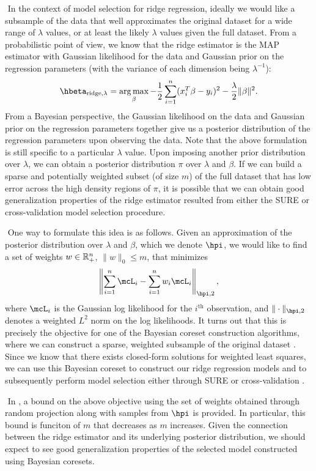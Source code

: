 $ $\newline
In the context of model selection for ridge regression, ideally we would like a subsample of the data that well approximates the original dataset for a wide range of $\lambda$ values, or at least the likely $\lambda$ values given the full dataset. From a probabilistic point of view, we know that the ridge estimator is the MAP estimator with Gaussian likelihood for the data and Gaussian prior on the regression parameters (with the variance of each dimension being $\lambda^{-1}$):
\[
\hbeta_{\text{ridge},\lambda} = \argmax_{\beta} -\frac{1}{2}\sum_{i=1}^n (x_i^T\beta - y_i)^2 - \frac{\lambda}{2}\|\beta\|^2.
\]
From a Bayesian perspective, the Gaussian likelihood on the data and Gaussian prior on the regression parameters together give us a posterior distribution of the regression parameters upon observing the data. Note that the above formulation is still specific to a particular $\lambda$ value. Upon imposing another prior distribution over $\lambda$, we can obtain a posterior distribution $\pi$ over $\lambda$ and $\beta$. If we can build a sparse and potentially weighted subset (of size $m$) of the full dataset that has low error across the high density regions of $\pi$, it is possible that we can obtain good generalization properties of the ridge estimator resulted from either the SURE or cross-validation model selection procedure.

$ $\newline
One way to formulate this idea is as follows. Given an approximation of the posterior distribution over $\lambda$ and $\beta$, which we denote $\hpi$, we would like to find a set of weights $w \in\mathbb{R}_+^n$, $\|w\|_0 \leq m$, that minimizes
\[
\left\| \sum_{i=1}^n \mcL_i - \sum_{i=1}^n w_i \mcL_i \right\|_{\hpi, 2},
\]
where $\mcL_i$ is the Gaussian log likelihood for the $i^\text{th}$ observation, and $\|\cdot\|_{\hpi, 2}$ denotes a weighted $L^2$ norm on the log likelihoods. It turns out that this is precisely the objective for one of the Bayesian coreset construction algorithms, where we can construct a sparse, weighted subsample of the original dataset \citep{campbell2019automated}. Since we know that there exists closed-form solutions for weighted least squares, we can use this Bayesian coreset to construct our ridge regression models and to subsequently perform model selection either through SURE or cross-validation \citep{strutz2011data}.

$ $\newline
In \citet{campbell2019automated}, a bound on the above objective using the set of weights obtained through random projection \citep{rahimi2007random} along with samples from $\hpi$ is provided. In particular, this bound is funciton of $m$ that decreases as $m$ increases. Given the connection between the ridge estimator and its underlying posterior distribution, we should expect to see good generalization properties of the selected model constructed using Bayesian coresets.

